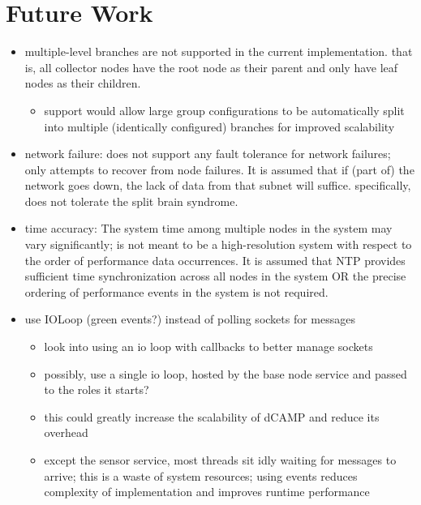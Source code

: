 \chapter{Future Work}
\label{future_work}

\begin{itemize}

\item multiple-level branches are not supported in the current implementation. that is, all collector nodes have the
      root node as their parent and only have leaf nodes as their children.
      \begin{itemize}
      \item support would allow large group configurations to be automatically split into multiple (identically
            configured) branches for improved scalability
      \end{itemize}

\item network failure: \dcamp does not support any fault tolerance for network failures; \dcamp only attempts to recover
from node failures. It is assumed that if (part of) the network goes down, the lack of data from that subnet will
suffice. specifically, \dcamp does not tolerate the split brain syndrome\cite{needed}.

\item time accuracy: The system time among multiple nodes in the system may vary significantly; \dcamp is not meant to
be a high-resolution system with respect to the order of performance data occurrences. It is assumed that NTP provides
sufficient time synchronization across all nodes in the system OR the precise ordering of performance events in the
system is not required.

\item use IOLoop (green events?) instead of polling sockets for messages
      \begin{itemize}
      \item look into using an io loop with callbacks to better manage sockets
      \item possibly, use a single io loop, hosted by the base node service and passed to the roles it starts?
      \item this could greatly increase the scalability of dCAMP and reduce its overhead
      \item except the sensor service, most threads sit idly waiting for messages to arrive; this is a waste of system
            resources; using events reduces complexity of implementation and improves runtime performance
      \end{itemize}


\end{itemize}
